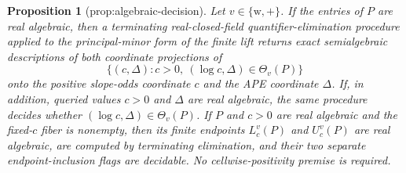 \documentclass{article}
\newtheorem{proposition}{Proposition}
\begin{document}
\begin{proposition}[prop:algebraic-decision]\label{prop:algebraic-decision}
Let \(v\in\{\mathrm w,+\}\).  If the entries of \(P\) are real algebraic, then a terminating real-closed-field quantifier-elimination procedure applied to the principal-minor form of the finite lift returns exact semialgebraic descriptions of both coordinate projections of
\[
 \{(c,\Delta):c>0,\ (\log c,\Delta)\in\Theta_v(P)\}
\]
onto the positive slope-odds coordinate \(c\) and the APE coordinate \(\Delta\).  If, in addition, queried values \(c>0\) and \(\Delta\) are real algebraic, the same procedure decides whether \((\log c,\Delta)\in\Theta_v(P)\).  If \(P\) and \(c>0\) are real algebraic and the fixed-\(c\) fiber is nonempty, then its finite endpoints \(L_c^v(P)\) and \(U_c^v(P)\) are real algebraic, are computed by terminating elimination, and their two separate endpoint-inclusion flags are decidable.  No cellwise-positivity premise is required.
\end{proposition}
\end{document}
